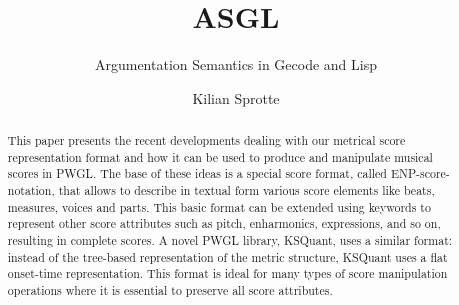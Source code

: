 \documentclass[runningheads,a4paper]{llncs}
\begin{document}
\mainmatter  %

\title{ASGL}
\subtitle{Argumentation Semantics in Gecode and Lisp}


%
%
\author{Kilian Sprotte}

%


%
%

\maketitle

\newcommand{\grsem}{\textit{grounded semantics}}
\newcommand{\prsem}{\textit{preferred semantics}}
\newcommand{\stsem}{\textit{stable semantics}}
\newcommand{\cosem}{\textit{complete semantics}}

\begin{abstract}
  This paper presents the recent developments dealing with our
  metrical score representation format and how it can be used to
  produce and manipulate musical scores in PWGL. The base of these
  ideas is a special score format, called ENP-score-notation, that
  allows to describe in textual form various score elements like
  beats, measures, voices and parts. This basic format can be extended
  using keywords to represent other score attributes such as pitch,
  enharmonics, expressions, and so on, resulting in complete scores. A
  novel PWGL library, KSQuant, uses a similar format: instead of the
  tree-based representation of the metric structure, KSQuant uses a
  flat onset-time representation.  This format is ideal for many types
  of score manipulation operations where it is essential to preserve
  all score attributes.
\end{abstract}
\end{document}
